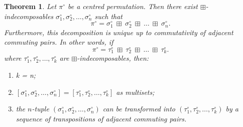 \documentclass[11pt,a4paper]{article}
\newtheorem{thm}{Theorem}[section]
\theoremstyle{definition}
\begin{document}
\begin{thm} \label{uniqueness}
Let $\pi^{\circ}$ be a centred permutation. Then there exist $\boxplus$-indecomposables $\sigma_{1}^{\circ}, \sigma_{2}^{\circ}, \dots, \sigma_{n}^{\circ}$ such that
\[
\pi^{\circ} = \sigma_{1}^{\circ} \ \boxplus \ \sigma_{2}^{\circ} \ \boxplus \ \dots \ \boxplus \ \sigma_{n}^{\circ}.
\]
Furthermore, this decomposition is unique up to commutativity of adjacent commuting pairs. In other words, if 
\[
\pi^{\circ} = \tau_{1}^{\circ} \ \boxplus \ \tau_{2}^{\circ} \ \boxplus \ \dots \ \boxplus \ \tau_{k}^{\circ}.
\]
where $\tau_{1}^{\circ}, \tau_{2}^{\circ}, \dots, \tau_{k}^{\circ}$ are $\boxplus$-indecomposables, then:
\begin{enumerate}
\item k = n;
\item $[\sigma_{1}^{\circ}, \sigma_{2}^{\circ}, \dots, \sigma_{n}^{\circ}] = [\tau_{1}^{\circ}, \tau_{2}^{\circ}, \dots, \tau_{k}^{\circ}]$ as multisets;
\item the $n$-tuple $(\sigma_{1}^{\circ}, \sigma_{2}^{\circ}, \dots, \sigma_{n}^{\circ})$ can be transformed into $(\tau_{1}^{\circ}, \tau_{2}^{\circ}, \dots, \tau_{k}^{\circ})$ by a sequence of transpositions of adjacent commuting pairs.
\end{enumerate}

\end{thm}
\end{document}
